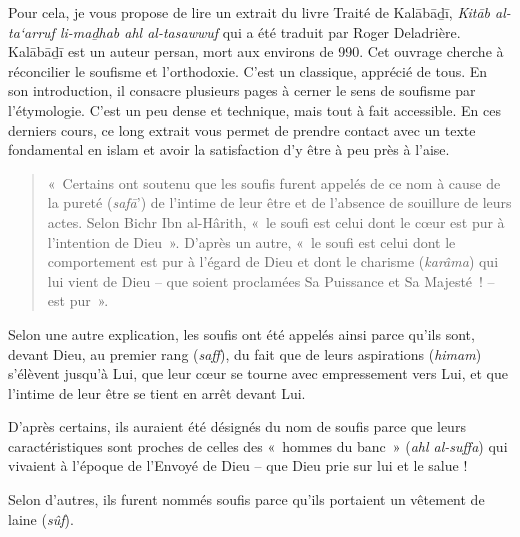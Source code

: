 Pour cela, je vous propose de lire un extrait du livre Traité de
Kalābāḏī, \emph{Kitāb al-ta`arruf li-maḏhab ahl al-tasawwuf} qui a été
traduit par Roger Deladrière\sn{~\textsc{Kalābāḏī}, \emph{Kitāb
  al-taʿarruf li-madhhab ahl al-taṣawwuf} {[}traduction française~:
  Traité de soufisme, Les Maîtres et les étapes, traduit de l'arabe et
  présenté par Roger Deladrière, Paris, Actes-Sud, Sinbad, 1981.}.
Kalābāḏī \label{theol:Kalabadi} est un auteur persan, mort aux environs de 990. Cet ouvrage
cherche à réconcilier le soufisme et l'orthodoxie. C'est un classique,
apprécié de tous. En son introduction, il consacre plusieurs pages à
cerner le sens de soufisme par l'étymologie. C'est un peu dense et
technique, mais tout à fait accessible. En ces derniers cours, ce long
extrait vous permet de prendre contact avec un texte fondamental en
islam et avoir la satisfaction d'y être à peu près à l'aise.
\begin{quote}
    

«~Certains ont soutenu que les soufis furent appelés de ce nom à cause
de la pureté (\emph{safā}') de l'intime de leur être et de l'absence de
souillure de leurs actes. Selon Bichr Ibn al-Hârith, «~le soufi est
celui dont le cœur est pur à l'intention de Dieu~». D'après un autre,
«~le soufi est celui dont le comportement est pur à l'égard de Dieu et
dont le charisme (\emph{karâma}) qui lui vient de Dieu -- que soient
proclamées Sa Puissance et Sa Majesté~! -- est pur~».
\end{quote}
Selon une autre explication, les soufis ont été appelés ainsi parce
qu'ils sont, devant Dieu, au premier rang (\emph{saff}), du fait que de
leurs aspirations (\emph{himam}) s'élèvent jusqu'à Lui, que leur cœur se
tourne avec empressement vers Lui, et que l'intime de leur être se tient
en arrêt devant Lui.

D'après certains, ils auraient été désignés du nom de soufis parce que
leurs caractéristiques sont proches de celles des «~hommes du banc~»
(\emph{ahl al-suffa}) qui vivaient à l'époque de l'Envoyé de Dieu -- que
Dieu prie sur lui et le salue !

Selon d'autres, ils furent nommés soufis parce qu'ils portaient un
vêtement de laine (\emph{sûf}).

